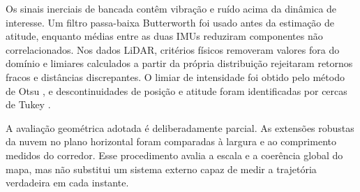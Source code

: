 Os sinais inerciais de bancada contêm vibração e ruído acima da dinâmica de interesse. Um filtro passa-baixa Butterworth foi usado antes da estimação de atitude, enquanto médias entre as duas IMUs reduziram componentes não correlacionados. Nos dados LiDAR, critérios físicos removeram valores fora do domínio e limiares calculados a partir da própria distribuição rejeitaram retornos fracos e distâncias discrepantes. O limiar de intensidade foi obtido pelo método de Otsu \parencite{otsu1979threshold}, e descontinuidades de posição e atitude foram identificadas por cercas de Tukey \parencite{tukey1977eda}.

A avaliação geométrica adotada é deliberadamente parcial. As extensões robustas da nuvem no plano horizontal foram comparadas à largura e ao comprimento medidos do corredor. Esse procedimento avalia a escala e a coerência global do mapa, mas não substitui um sistema externo capaz de medir a trajetória verdadeira em cada instante.
